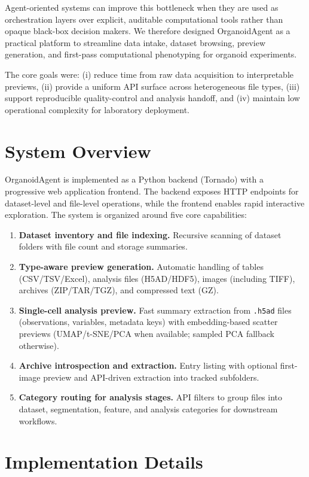 \documentclass[11pt]{article}
\begin{document}
Agent-oriented systems can improve this bottleneck when they are used as orchestration layers over explicit, auditable computational tools rather than opaque black-box decision makers. We therefore designed OrganoidAgent as a practical platform to streamline data intake, dataset browsing, preview generation, and first-pass computational phenotyping for organoid experiments.

The core goals were: (i) reduce time from raw data acquisition to interpretable previews, (ii) provide a uniform API surface across heterogeneous file types, (iii) support reproducible quality-control and analysis handoff, and (iv) maintain low operational complexity for laboratory deployment.

\section{System Overview}
OrganoidAgent is implemented as a Python backend (Tornado) with a progressive web application frontend. The backend exposes HTTP endpoints for dataset-level and file-level operations, while the frontend enables rapid interactive exploration. The system is organized around five core capabilities:

\begin{enumerate}
\item \textbf{Dataset inventory and file indexing.} Recursive scanning of dataset folders with file count and storage summaries.
\item \textbf{Type-aware preview generation.} Automatic handling of tables (CSV/TSV/Excel), analysis files (H5AD/HDF5), images (including TIFF), archives (ZIP/TAR/TGZ), and compressed text (GZ).
\item \textbf{Single-cell analysis preview.} Fast summary extraction from \texttt{.h5ad} files (observations, variables, metadata keys) with embedding-based scatter previews (UMAP/t-SNE/PCA when available; sampled PCA fallback otherwise).
\item \textbf{Archive introspection and extraction.} Entry listing with optional first-image preview and API-driven extraction into tracked subfolders.
\item \textbf{Category routing for analysis stages.} API filters to group files into dataset, segmentation, feature, and analysis categories for downstream workflows.
\end{enumerate}

\section{Implementation Details}
\end{document}
